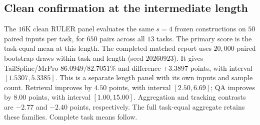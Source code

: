 \subsection{Clean confirmation at the intermediate length}
\label{sec:clean16k-confirmation}
The $16$K clean RULER panel evaluates the same $s=4$ frozen constructions on
$50$ paired inputs per task, for $650$ pairs across all $13$ tasks. The primary
score is the task-equal mean at this length. The completed matched report uses
$20{,}000$ paired bootstrap draws within task and length (seed $20260923$).
It gives TailSpline/MrPro $86.0949/82.7051\%$ and difference $+3.3897$ points,
with interval $[1.5307,5.3385]$. This is a separate length panel with its own
inputs and sample count.
Retrieval improves by $4.50$ points, with interval $[2.50,6.69]$; QA improves
by $8.00$ points, with interval $[1.00,15.00]$. Aggregation and tracking
contrasts are $-2.77$ and $-2.40$ points, respectively. The full task-equal
aggregate retains these families. Complete task means follow.

